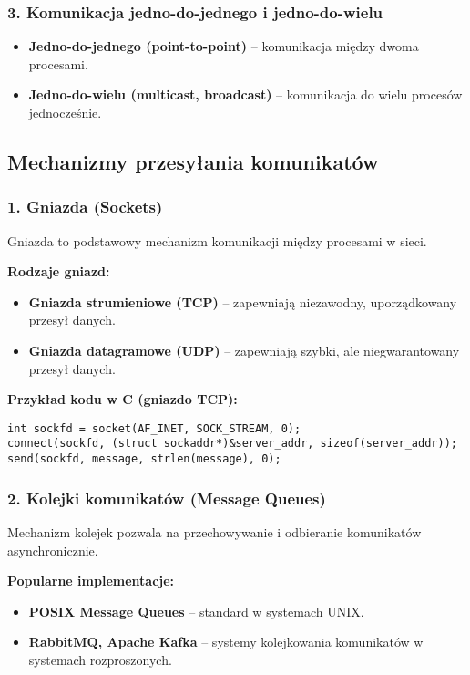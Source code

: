 \subsubsection{3. Komunikacja jedno-do-jednego i jedno-do-wielu}
\begin{itemize}
    \item \textbf{Jedno-do-jednego (point-to-point)} – komunikacja między dwoma procesami.
    \item \textbf{Jedno-do-wielu (multicast, broadcast)} – komunikacja do wielu procesów jednocześnie.
\end{itemize}

\subsection{Mechanizmy przesyłania komunikatów}

\subsubsection{1. Gniazda (Sockets)}
Gniazda to podstawowy mechanizm komunikacji między procesami w sieci.

\textbf{Rodzaje gniazd:}
\begin{itemize}
    \item \textbf{Gniazda strumieniowe (TCP)} – zapewniają niezawodny, uporządkowany przesył danych.
    \item \textbf{Gniazda datagramowe (UDP)} – zapewniają szybki, ale niegwarantowany przesył danych.
\end{itemize}

\textbf{Przykład kodu w C (gniazdo TCP):}
\begin{verbatim}
int sockfd = socket(AF_INET, SOCK_STREAM, 0);
connect(sockfd, (struct sockaddr*)&server_addr, sizeof(server_addr));
send(sockfd, message, strlen(message), 0);
\end{verbatim}

\subsubsection{2. Kolejki komunikatów (Message Queues)}
Mechanizm kolejek pozwala na przechowywanie i odbieranie komunikatów asynchronicznie.

\textbf{Popularne implementacje:}
\begin{itemize}
    \item \textbf{POSIX Message Queues} – standard w systemach UNIX.
    \item \textbf{RabbitMQ, Apache Kafka} – systemy kolejkowania komunikatów w systemach rozproszonych.
\end{itemize}

